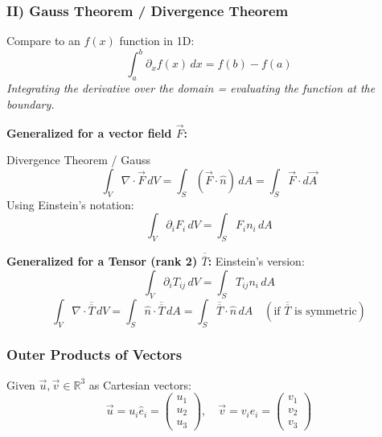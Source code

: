 \subsubsection{II) Gauss Theorem / Divergence Theorem}

Compare to an $f(x)$ function in 1D:
$$ \int_a^b \partial_x f(x) \, dx = f(b) - f(a) $$
\textit{Integrating the derivative over the domain = evaluating the function at the boundary.}

\begin{center}
\end{center}

\textbf{Generalized for a vector field $\vec{F}$:}

\begin{center}
\end{center}

\begin{thmbox}{Divergence Theorem / Gauss}
$$ \int_V \nabla \cdot \vec{F} \, dV = \int_S (\vec{F} \cdot \hat{n}) \, dA = \int_S \vec{F} \cdot d\vec{A} $$
Using Einstein's notation:
$$ \int_V \partial_i F_i \, dV = \int_S F_i n_i \, dA $$
\end{thmbox}

\textbf{Generalized for a Tensor (rank 2) $\overline{\overline{T}}$:}
Einstein's version:
$$ \int_V \partial_i T_{ij} \, dV = \int_S T_{ij} n_i \, dA $$
$$ \int_V \nabla \cdot \overline{\overline{T}} \, dV = \int_S \hat{n} \cdot \overline{\overline{T}} \, dA = \int_S \overline{\overline{T}} \cdot \hat{n} \, dA \quad (\text{if } \overline{\overline{T}} \text{ is symmetric}) $$

\subsubsection{Outer Products of Vectors}
Given $\vec{u}, \vec{v} \in \mathbb{R}^3$ as Cartesian vectors:
$$ \vec{u} = u_i \hat{e}_i = \begin{pmatrix} u_1 \\ u_2 \\ u_3 \end{pmatrix}, \quad \vec{v} = v_i \hat{e}_i = \begin{pmatrix} v_1 \\ v_2 \\ v_3 \end{pmatrix} $$


